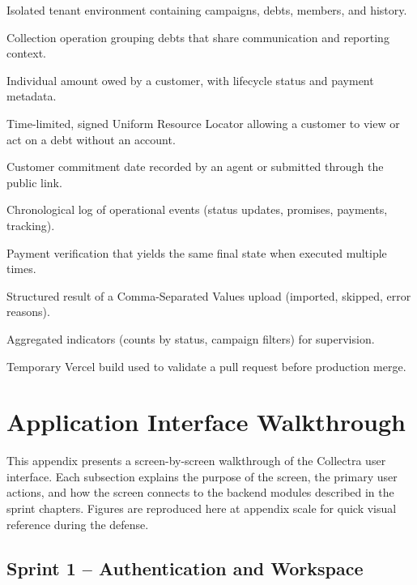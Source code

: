 \documentclass[12pt,a4paper]{report}
\begin{document}
\begin{description}[style=nextline, leftmargin=3.2cm, labelwidth=2.8cm, itemsep=8pt]
  \item[Workspace] Isolated tenant environment containing campaigns, debts, members, and history.
  \item[Campaign] Collection operation grouping debts that share communication and reporting context.
  \item[Debt] Individual amount owed by a customer, with lifecycle status and payment metadata.
  \item[Personal link] Time-limited, signed Uniform Resource Locator allowing a customer to view or act on a debt without an account.
  \item[Promise to pay] Customer commitment date recorded by an agent or submitted through the public link.
  \item[Action history] Chronological log of operational events (status updates, promises, payments, tracking).
  \item[Idempotent confirmation] Payment verification that yields the same final state when executed multiple times.
  \item[Import summary] Structured result of a Comma-Separated Values upload (imported, skipped, error reasons).
  \item[Manager dashboard] Aggregated indicators (counts by status, campaign filters) for supervision.
  \item[Preview deployment] Temporary Vercel build used to validate a pull request before production merge.
\end{description}

\chapter{Application Interface Walkthrough}
\label{app:screenshots}

This appendix presents a screen-by-screen walkthrough of the Collectra user interface.
Each subsection explains the purpose of the screen, the primary user actions, and how the
screen connects to the backend modules described in the sprint chapters.
Figures are reproduced here at appendix scale for quick visual reference during the defense.

\section{Sprint 1 -- Authentication and Workspace}
\end{document}
